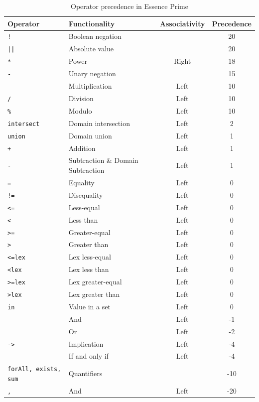 \documentclass[a4paper]{article}
\newcommand{\eprime}{{\sc Essence Prime}\xspace}
\begin{document}
\begin{table}
\begin{center}
\begin{tabular}{l|lcc}
Operator & Functionality & Associativity & Precedence \\
\hline
{\tt !} & Boolean negation &  & 20\\
{\tt ||} & Absolute value  &  & 20\\
\hline
{\tt **} & Power & Right & 18 \\
\hline
{\tt -} & Unary negation &   & 15\\
\hline
{\tt *} & Multiplication & Left & 10 \\
{\tt /} & Division & Left & 10 \\
{\tt \%} & Modulo & Left & 10 \\
\hline
{\tt intersect} & Domain intersection & Left & 2 \\
\hline
{\tt union} & Domain union & Left & 1 \\
{\tt +} & Addition & Left & 1 \\
{\tt -} & Subtraction \& Domain Subtraction & Left & 1 \\
\hline
{\tt =} & Equality & Left & 0 \\
{\tt !=} & Disequality & Left & 0 \\
{\tt <=} & Less-equal & Left & 0 \\
{\tt <} & Less than & Left & 0 \\
{\tt >=} & Greater-equal & Left & 0 \\
{\tt >} & Greater than & Left & 0 \\
{\tt <=lex} & Lex less-equal & Left & 0 \\
{\tt <lex} & Lex less than & Left & 0 \\
{\tt >=lex} & Lex greater-equal & Left & 0 \\
{\tt >lex} & Lex greater than & Left & 0 \\
\hline
{\tt in} & Value in a set & Left & 0 \\
\hline
{\tt \verb1/\1} & And & Left & -1 \\
\hline
{\tt \verb1\/1} & Or & Left & -2 \\
\hline
{\tt ->} & Implication & Left & -4 \\
{\tt <->} & If and only if & Left & -4 \\
\hline
{\tt forAll, exists, sum} & Quantifiers & & -10 \\
\hline
{\tt ,} & And & Left & -20 \\
      \end{tabular}
\end{center}
    \caption{Operator precedence in \eprime}

\label{tab:precedence}
\end{table}
\end{document}
